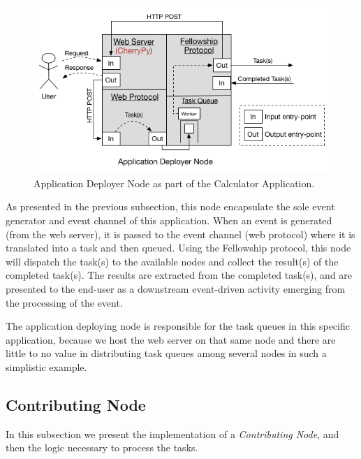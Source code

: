 \documentclass[12pt, titlepage]{uo_temp}
\begin{document}
     \begin{figure}[h!]
       \centering
       \includegraphics[width=125mm]{images/calc_app_dep.png}
       \caption{Application Deployer Node as part of the Calculator Application.}
     \end{figure}
     As presented in the previous subsection, this node encapsulate the sole event
     generator and event channel of this application. When an event is generated (from the
     web server), it is passed to the event channel (web protocol) where it is translated
     into a task and then queued. Using the Fellowship protocol, this node will dispatch
     the task(s) to the available nodes and collect the result(s) of the completed
     task(s). The results are extracted from the completed task(s), and are presented to
     the end-user as a downstream event-driven activity emerging from the processing of
     the event.

     The application deploying node is responsible for the task queues in this specific
     application, because we host the web server on that same node and there are little to
     no value in distributing task queues among several nodes in such a simplistic
     example.

     \subsection{Contributing Node}
     In this subsection we present the implementation of a \emph{Contributing Node}, and then
     the logic necessary to process the tasks.
\end{document}
